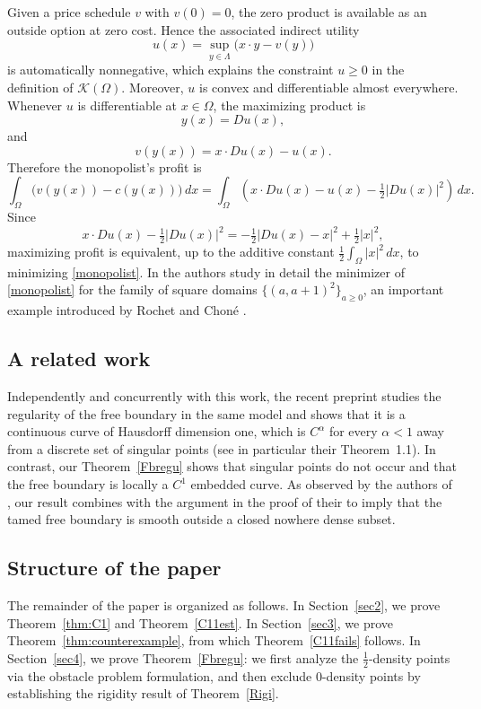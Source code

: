 \documentclass[reqno,11pt]{amsart}
\numberwithin{equation}{section}
\theoremstyle{remark}
\begin{document}
Given a price schedule $v$ with $v(0)=0$,
the zero product is available as an outside option at zero cost.
Hence the associated indirect utility
\[
u(x)=\sup_{y\in\Lambda}\bigl(x\cdot y-v(y)\bigr)
\]
is automatically nonnegative, which explains the constraint $u\ge0$ in the definition of
$\mathcal K(\Omega)$.
Moreover, $u$ is convex and differentiable almost everywhere.
Whenever $u$ is differentiable at $x\in\Omega$, the maximizing product is
\[
y(x)=Du(x),
\]
and
\[
v(y(x))=x\cdot Du(x)-u(x).
\]
Therefore the monopolist's profit is
\[
\int_\Omega \bigl(v(y(x))-c(y(x))\bigr)\,dx
=
\int_\Omega
\left(
x\cdot Du(x)-u(x)-\tfrac12 |Du(x)|^2
\right)\,dx.
\]
Since
\[
x\cdot Du(x)-\tfrac12 |Du(x)|^2
=
-\tfrac12 |Du(x)-x|^2+\tfrac12 |x|^2,
\]
maximizing profit is equivalent, up to the additive constant
$\frac12\int_\Omega |x|^2\,dx$, to minimizing \eqref{monopolist}.
In \cite{MRZ20252} the authors study in detail the minimizer of \eqref{monopolist}
for the family of square domains $\{(a,a+1)^2\}_{a\ge0}$, an important example introduced by
Rochet and Chon\'e \cite{RC98}.





\subsection{A related work}\label{sec:related}
Independently and concurrently with this work, the recent preprint \cite{Mc2026} studies the regularity of the free boundary in the same model and shows that it is a continuous curve of Hausdorff dimension one, which is $C^\alpha$ for every $\alpha<1$ away from a discrete set of singular points (see in particular their Theorem~1.1). 
In contrast, our Theorem~\ref{Fbregu} shows that singular points do not occur and that the free boundary is locally a $C^1$ embedded curve.  As observed by the authors of \cite{Mc2026}, our result combines with the argument in the proof of their \cite[Proposition~4.6]{Mc2026} to imply that the tamed free boundary is smooth outside a closed nowhere dense subset.


\subsection{Structure of the paper}

The remainder of the paper is organized as follows.
In Section~\ref{sec2}, we prove Theorem~\ref{thm:C1} and Theorem~\ref{C11est}.
In Section~\ref{sec3}, we prove Theorem~\ref{thm:counterexample}, from which Theorem~\ref{C11fails} follows.
In Section~\ref{sec4}, we prove Theorem~\ref{Fbregu}: we first analyze the $\frac12$-density points via the obstacle problem formulation, and then exclude $0$-density points by establishing the rigidity result of Theorem~\ref{Rigi}.
\end{document}
